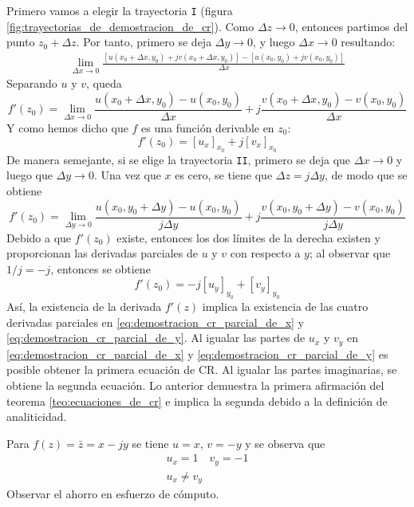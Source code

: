 Primero vamos a elegir la trayectoria \texttt{I} (figura \ref{fig:trayectorias_de_demostracion_de_cr}). Como $\Delta z \to 0$, entonces partimos del punto $z_0+\Delta z$. Por tanto, primero se deja $\Delta y \to 0$, y luego $\Delta x \to 0$ resultando:
\begin{align*}
  \lim_{\Delta x \to 0}\frac{[u(x_0+\Delta x,y_0)+jv(x_0+\Delta x, y_0)]-[u(x_0,y_0)+jv(x_0,y_0)]}{\Delta x}
\end{align*}
Separando $u$ y $v$, queda
\begin{equation*}
  f'(z_0)=\lim_{\Delta x \to 0} \frac{u(x_0+\Delta x,y_0)-u(x_0,y_0)}{\Delta x} + j\frac{v(x_0+\Delta x,y_0)-v(x_0,y_0)}{\Delta x}
\end{equation*}
Y como hemos dicho que $f$ es una función derivable en $z_0$:
\begin{equation}\label{eq:demostracion_cr_parcial_de_x}
  \boxed{f'(z_0)=[u_x]_{x_0} + j[v_x]_{x_0}}
\end{equation}
De manera semejante, si se elige la trayectoria \texttt{II}, primero se deja que $\Delta x \to 0$ y luego que $\Delta y \to 0$. Una vez que $x$ es cero, se tiene que $\Delta z = j\Delta y$, de modo que se obtiene
\begin{equation*}
  f'(z_0) = \lim_{\Delta y \to 0}\frac{u(x_0,y_0+\Delta y)-u(x_0,y_0)}{j\Delta y} + j\frac{v(x_0,y_0+\Delta y)-v(x_0,y_0)}{j\Delta y}
\end{equation*}
Debido a que $f'(z_0)$ existe, entonces los dos límites de la derecha existen y proporcionan las derivadas parciales de $u$ y $v$ con respecto a $y$; al observar que $1/j=-j$, entonces se obtiene
\begin{equation}\label{eq:demostracion_cr_parcial_de_y}
  \boxed{f'(z_0) = -j[u_y]_{y_0} + [v_y]_{y_0}}
\end{equation}
Así, la existencia de la derivada $f'(z)$ implica la existencia de las cuatro derivadas parciales en \ref{eq:demostracion_cr_parcial_de_x} y \ref{eq:demostracion_cr_parcial_de_y}. Al igualar las partes de $u_x$ y $v_y$ en \ref{eq:demostracion_cr_parcial_de_x} y \ref{eq:demostracion_cr_parcial_de_y} es posible obtener la primera ecuación de CR. Al igualar las partes imaginarias, se obtiene la segunda ecuación. Lo anterior demuestra la primera afirmación del teorema \ref{teo:ecuaciones_de_cr} e implica la segunda debido a la definición de analiticidad.

\begin{example}
  Para $f(z)=\bar{z}=x-jy$ se tiene $u=x$, $v=-y$ y se observa que
  \begin{gather*}
    u_x=1 \quad v_y = -1 \\ 
    u_x \neq v_y
  \end{gather*}
  Observar el ahorro en esfuerzo de cómputo.
\end{example}

